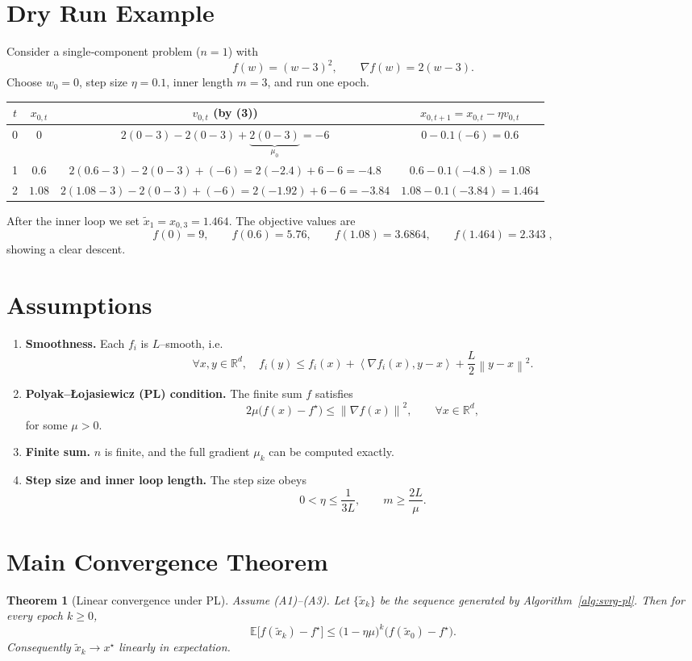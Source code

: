 \documentclass{article}
\newtheorem{theorem}{Theorem}
\newcommand{\EE}{\mathbb{E}}
\newcommand{\R}{\mathbb{R}}
\newcommand{\norm}[1]{\left\|#1\right\|}
\newcommand{\inner}[2]{\left\langle #1,#2\right\rangle}
\begin{document}
\section*{Dry Run Example}
Consider a single‑component problem ($n=1$) with  
\[
f(w)= (w-3)^2,\qquad \nabla f(w)=2(w-3).
\]
Choose $w_0=0$, step size $\eta=0.1$, inner length $m=3$, and run one epoch.

\begin{center}
\begin{tabular}{c|c|c|c}
$t$ & $x_{0,t}$ & $v_{0,t}$ (by (3)) & $x_{0,t+1}=x_{0,t}-\eta v_{0,t}$\\ \hline
0 & $0$ & $2(0-3)-2(0-3)+\underbrace{2(0-3)}_{\mu_0}= -6$ & $0-0.1(-6)=0.6$\\
1 & $0.6$ & $2(0.6-3)-2(0-3)+(-6)=2(-2.4)+6-6=-4.8$ & $0.6-0.1(-4.8)=1.08$\\
2 & $1.08$ & $2(1.08-3)-2(0-3)+(-6)=2(-1.92)+6-6=-3.84$ & $1.08-0.1(-3.84)=1.464$\\
\end{tabular}
\end{center}

After the inner loop we set $\tilde x_1=x_{0,3}=1.464$.
The objective values are
\[
f(0)=9,\qquad f(0.6)=5.76,\qquad f(1.08)=3.6864,\qquad f(1.464)=2.343\;,
\]
showing a clear descent.

\newpage
\section*{Assumptions}
\begin{enumerate}
\item \textbf{Smoothness.} Each $f_i$ is $L$–smooth, i.e.
\[
\forall x,y\in\R^d,\quad 
f_i(y)\le f_i(x)+\inner{\nabla f_i(x)}{y-x}+\frac{L}{2}\norm{y-x}^2 .\tag{A1}
\]
\item \textbf{Polyak–\L{}ojasiewicz (PL) condition.} The finite sum $f$ satisfies
\[
2\mu\bigl(f(x)-f^{\star}\bigr)\le \norm{\nabla f(x)}^2,\qquad\forall x\in\R^d ,\tag{A2}
\]
for some $\mu>0$.
\item \textbf{Finite sum.} $n$ is finite, and the full gradient $\mu_k$ can be
computed exactly.
\item \textbf{Step size and inner loop length.} The step size obeys
\[
0<\eta\le \frac{1}{3L},\qquad 
m\ge \frac{2L}{\mu}. \tag{A3}
\]
\end{enumerate}

\section*{Main Convergence Theorem}
\begin{theorem}[Linear convergence under PL]\label{thm:linear}
Assume (A1)–(A3). Let $\{\tilde x_k\}$ be the sequence generated by
Algorithm~\ref{alg:svrg-pl}. Then for every epoch $k\ge0$,
\[
\EE\!\bigl[f(\tilde x_k)-f^{\star}\bigr]\le
\bigl(1-\eta\mu\bigr)^k\bigl(f(\tilde x_0)-f^{\star}\bigr). \tag{T1}
\]
Consequently $\tilde x_k\to x^{\star}$ linearly in expectation.
\end{theorem}
\end{document}
